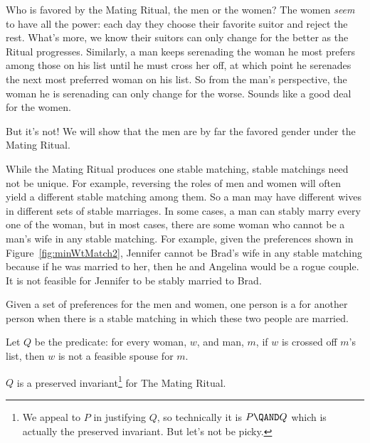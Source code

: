 Who is favored by the Mating Ritual, the men or the women?  The women
\emph{seem} to have all the power: each day they choose their favorite
suitor and reject the rest.  What's more, we know their suitors can
only change for the better as the Ritual progresses.  Similarly, a man
keeps serenading the woman he most prefers among those on his list
until he must cross her off, at which point he serenades the next most
preferred woman on his list.  So from the man's perspective, the woman
he is serenading can only change for the worse.  Sounds like a good
deal for the women.

But it's not!  We will show that the men are by far the favored gender
under the Mating Ritual.

While the Mating Ritual produces one stable matching, stable matchings
need not be unique.  For example, reversing the roles of men and women
will often yield a different stable matching among them.  So a man may
have different wives in different sets of stable marriages.
In some cases, a man can stably marry every one of the woman, but in
most cases, there are some woman who cannot be a man's wife in any
stable matching.  For example, given the preferences shown in
Figure~\ref{fig:minWtMatch2}, Jennifer cannot be Brad's wife in any
stable matching because if he was married to her, then he and Angelina
would be a rogue couple.  It is not feasible for Jennifer to be stably
married to Brad.

\begin{definition}
Given a set of preferences for the men and women, one person is a
 for another person when there is a stable
matching in which these two people are married.
\end{definition}

\begin{definition}\label{infeasibleP}
Let $Q$ be the predicate: for every woman, $w$, and man, $m$, if
$w$ is crossed off $m$'s list, then $w$ is not a feasible spouse for $m$.
\end{definition}

\begin{lemma}\label{lem:infeasible}
  $Q$ is a preserved invariant\footnote{We appeal to $P$ in justifying
    $Q$, so technically it is $P \QAND Q$ which is actually the
    preserved invariant.  But let's not be picky.} for The Mating
  Ritual.

\end{lemma}

